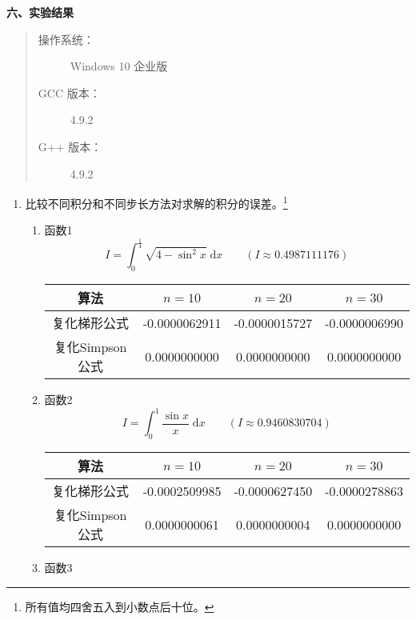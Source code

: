 \documentclass[a4paper,11pt]{article}
\begin{document}
\begin{Large}
	\textbf{六、实验结果}
\end{Large}
\begin{quote}
	\begin{description}
		\item[操作系统：] Windows 10 企业版
		\item[GCC 版本：] 4.9.2
		\item[G++ 版本：] 4.9.2
	\end{description}
\end{quote}
\begin{enumerate}
	\item 比较不同积分和不同步长方法对求解的积分的误差。\footnote{所有值均四舍五入到小数点后十位。}
	\begin{enumerate}[(1)]
		\item 函数1
			\begin{displaymath}
				I=\int_{0}^{\frac{1}{4}}\sqrt{4-\sin^{2}{x}}\;\mathrm{d}x\qquad(I\approx{}0.4987111176)
			\end{displaymath}
			\begin{center}
				\begin{tabular}{|c|c|c|c|}
					\hline
					算法 & $n=10$ & $n=20$ & $n=30$\\
					\hline 
					复化梯形公式 & -0.0000062911 & -0.0000015727 & -0.0000006990 \\
					\hline
					复化Simpson公式 & 0.0000000000 & 0.0000000000 & 0.0000000000 \\
					\hline
				\end{tabular}
			\end{center}
		\item 函数2
			\begin{displaymath}
				I=\int_{0}^{1}\frac{\sin{x}}{x}\;\mathrm{d}x\qquad(I\approx{}0.9460830704)
			\end{displaymath}
			\begin{center}
				\begin{tabular}{|c|c|c|c|}
					\hline
					算法 & $n=10$ & $n=20$ & $n=30$\\
					\hline 
					复化梯形公式 & -0.0002509985 & -0.0000627450 & -0.0000278863 \\
					\hline
					复化Simpson公式 & 0.0000000061 & 0.0000000004 & 0.0000000000 \\
					\hline
				\end{tabular}
			\end{center}
		\item 函数3
			\begin{displaymath}

\end{displaymath}
\end{enumerate}
\end{enumerate}
\end{document}
